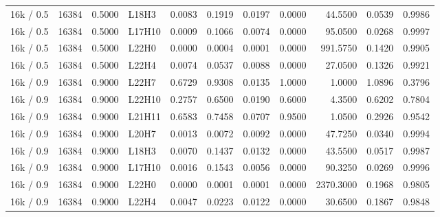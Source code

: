 \begin{tabular}{lrrlrrrrrrr}
16k / 0.5 & 16384 & 0.5000 & L18H3 & 0.0083 & 0.1919 & 0.0197 & 0.0000 & 44.5500 & 0.0539 & 0.9986 \\
16k / 0.5 & 16384 & 0.5000 & L17H10 & 0.0009 & 0.1066 & 0.0074 & 0.0000 & 95.0500 & 0.0268 & 0.9997 \\
16k / 0.5 & 16384 & 0.5000 & L22H0 & 0.0000 & 0.0004 & 0.0001 & 0.0000 & 991.5750 & 0.1420 & 0.9905 \\
16k / 0.5 & 16384 & 0.5000 & L22H4 & 0.0074 & 0.0537 & 0.0088 & 0.0000 & 27.0500 & 0.1326 & 0.9921 \\
16k / 0.9 & 16384 & 0.9000 & L22H7 & 0.6729 & 0.9308 & 0.0135 & 1.0000 & 1.0000 & 1.0896 & 0.3796 \\
16k / 0.9 & 16384 & 0.9000 & L22H10 & 0.2757 & 0.6500 & 0.0190 & 0.6000 & 4.3500 & 0.6202 & 0.7804 \\
16k / 0.9 & 16384 & 0.9000 & L21H11 & 0.6583 & 0.7458 & 0.0707 & 0.9500 & 1.0500 & 0.2926 & 0.9542 \\
16k / 0.9 & 16384 & 0.9000 & L20H7 & 0.0013 & 0.0072 & 0.0092 & 0.0000 & 47.7250 & 0.0340 & 0.9994 \\
16k / 0.9 & 16384 & 0.9000 & L18H3 & 0.0070 & 0.1437 & 0.0132 & 0.0000 & 43.5500 & 0.0517 & 0.9987 \\
16k / 0.9 & 16384 & 0.9000 & L17H10 & 0.0016 & 0.1543 & 0.0056 & 0.0000 & 90.3250 & 0.0269 & 0.9996 \\
16k / 0.9 & 16384 & 0.9000 & L22H0 & 0.0000 & 0.0001 & 0.0001 & 0.0000 & 2370.3000 & 0.1968 & 0.9805 \\
16k / 0.9 & 16384 & 0.9000 & L22H4 & 0.0047 & 0.0223 & 0.0122 & 0.0000 & 30.6500 & 0.1867 & 0.9848 \\
\bottomrule
\end{tabular}
